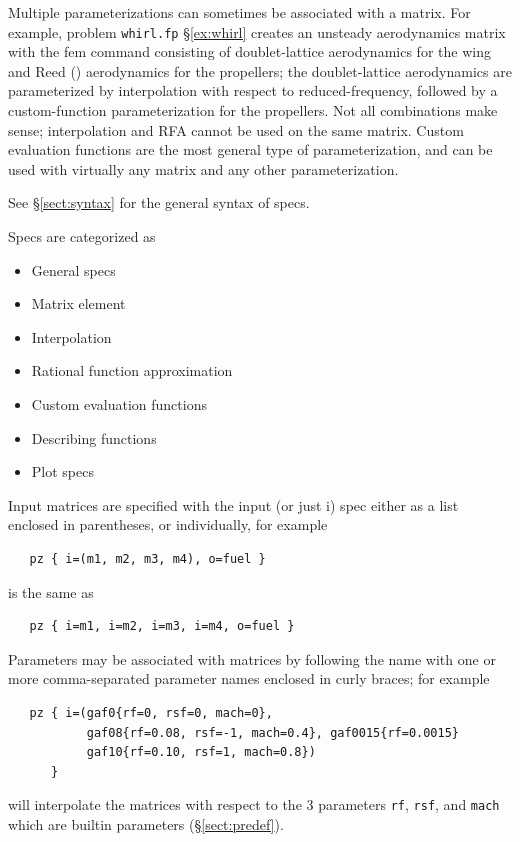 \documentclass[11pt,openany,twoside]{book}
\numberwithin{equation}{section}		%
\newcommand{\Cmd}[1]{{\sf #1}}
\newcommand{\Code}[1]{{\small\tt #1}}
\newcommand{\Spec}[1]{{\small\ttfamily #1}}
\newcommand{\Sectref}[1]{\S\ref{#1}}
\begin{document}
\par
Multiple parameterizations can sometimes be associated with
a matrix. For example, problem \Code{whirl.fp} \Sectref{ex:whirl}
creates an unsteady aerodynamics matrix with the \Cmd{fem} command
consisting of doublet-lattice aerodynamics for the wing and Reed
(\cite{reed1961analytical})
aerodynamics for the propellers; the doublet-lattice aerodynamics
are parameterized by interpolation with respect to reduced-frequency,
followed by a custom-function parameterization for the propellers.
Not all combinations make sense; interpolation and RFA cannot
be used on the same matrix. Custom evaluation functions
are the most general type of parameterization, and
can be used with virtually any matrix and any other parameterization.

See \Sectref{sect:syntax} for the general syntax of specs.
\par
Specs are categorized as
\begin{itemize}
\item General specs
\item Matrix element
\item Interpolation
\item Rational function approximation
\item Custom evaluation functions
\item Describing functions
\item Plot specs
\end{itemize}

Input matrices are specified with the \Spec{input} (or just \Spec{i})
spec either as a list enclosed in parentheses, or individually, for example
\begin{lstlisting}
   pz { i=(m1, m2, m3, m4), o=fuel }
\end{lstlisting}
is the same as
\begin{lstlisting}
   pz { i=m1, i=m2, i=m3, i=m4, o=fuel }
\end{lstlisting}

Parameters may be associated with matrices by following the
name with one or more comma-separated parameter names
enclosed in curly braces; for example
\begin{lstlisting}
   pz { i=(gaf0{rf=0, rsf=0, mach=0},
           gaf08{rf=0.08, rsf=-1, mach=0.4}, gaf0015{rf=0.0015}
           gaf10{rf=0.10, rsf=1, mach=0.8})
      }
\end{lstlisting}
will interpolate the matrices with respect to the 3 parameters \Code{rf},
\Code{rsf}, and \Code{mach} which are builtin parameters (\Sectref{sect:predef}).
\end{document}
